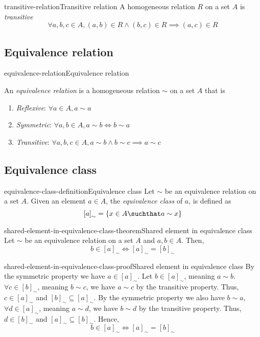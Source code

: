 \documentclass[preview]{standalone}
\begin{document}
\begin{snippetdefinition}{transitive-relation}{Transitive relation}{
    A homogeneous relation \(R\) on a set \(A\) is \textit{transitive}
    \[
        \forall a,b,c \in A, (a,b) \in R \land (b,c) \in R \implies (a,c) \in R 
    \]
}
\end{snippetdefinition}

\subsection{Equivalence relation}

\begin{snippetdefinition}{equivalence-relation}{Equivalence relation}{
    An \textit{equivalence relation} is a homogeneous relation \(\sim\) on a set \(A\)
    that is
    \begin{enumerate}
        \item \textit{Reflexive}: \(\forall a \in A, a \sim a\)
        \item \textit{Symmetric}: \(\forall a,b \in A, a \sim b \iff b \sim a\)
        \item \textit{Transitive}: \(\forall a,b,c \in A, a \sim b \land b \sim c \implies a \sim c\)
    \end{enumerate}
}
\end{snippetdefinition}

\subsection{Equivalence class}

\begin{snippetdefinition}{equivalence-class-definition}{Equivalence class}{
    Let \(\sim\) be an equivalence relation on a set \(A\).
    Given an element \(a\in A\), the \textit{equivalence class} of \(a\), is defined as
    \[
        {[a]}_{\sim} = \{x \in A \suchthat a \sim x\}
    \]
}
\end{snippetdefinition}

\begin{snippettheorem}{shared-element-in-equivalence-class-theorem}{Shared element in equivalence class}{
    Let \(\sim\) be an equivalence relation on a set \(A\)
    and \(a,b \in A\).
    Then,
    \[
        b \in {[a]}_{\sim} \iff {[a]}_{\sim} = {[b]}_{\sim}
    \]
}
\end{snippettheorem}

\begin{snippetproof}{shared-element-in-equivalence-class-proof}{Shared element in equivalence class}{
    By the symmetric property we have \(a \in {[a]}_{\sim}\).
    Let \(b \in {[a]}_{\sim}\), meaning \(a \sim b\). \(\forall c \in {[b]}_{\sim}\),
    meaning \(b \sim c\), we have \(a \sim c\) by the transitive property.
    Thus, \(c \in {[a]}_{\sim}\) and \({[b]}_{\sim} \subseteq {[a]}_{\sim}\).
    By the symmetric property we also have \(b \sim a\),
    \(\forall d \in {[a]}_{\sim}\), meaning \(a \sim d\), we have
    \(b \sim d\) by the transitive property. Thus, \(d \in {[b]}_{\sim}\)
    and \({[a]}_{\sim} \subseteq {[b]}_{\sim}\). Hence,
    \[
        b \in {[a]}_{\sim} \iff {[a]}_{\sim} = {[b]}_{\sim}
    \]
}
\end{snippetproof}
\end{document}

